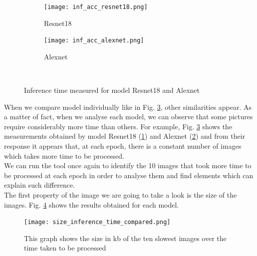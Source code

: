 \begin{figure}[h]
     \begin{subfigure}{0.5\textwidth}
	    \texttt{[image: inf\_acc\_resnet18.png]}
	    \caption{Resnet18}
         \label{fig:inf_acc_resnet18}
         
     \end{subfigure}
     \hfill
     \begin{subfigure}{0.5\textwidth}
	    \texttt{[image: inf\_acc\_alexnet.png]}
	    \caption{Alexnet}
        \label{fig:inf_acc_alexnet}
        
     \end{subfigure}\\
     \caption{Inference time measured for model Resnet18 and Alexnet}
        \label{fig:inf_acc_c}
\end{figure}
When we compare model individually like in Fig. \ref{fig:inf_acc_c}, other similarities appear. As a matter of fact, when we analyse each model, we can observe that some pictures require considerably more time than others. For example, Fig. \ref{fig:inf_acc_c} shows the measurements obtained by model Resnet18 (\ref{fig:inf_acc_resnet18}) and Alexnet (\ref{fig:inf_acc_alexnet}) and from their response it appears that, at each epoch, there is a constant number of images which takes more time to be processed. \\
We can run the tool once again to identify the 10 images that took more time to be processed at each epoch in order to analyse them and find elements which can explain such difference. \\
The first property of the image we are going to take a look is the size of the images. Fig. \ref{fig:size_inference_time_compared} shows the results obtained for each model. 


\begin{figure}[h]
       \centering 
	    \texttt{[image: size\_inference\_time\_compared.png]}
        \caption[Size of the images over inference time]{This graph shows the size in kb of the ten slowest images over the time taken to be processed }
         \label{fig:size_inference_time_compared}
\end{figure}



